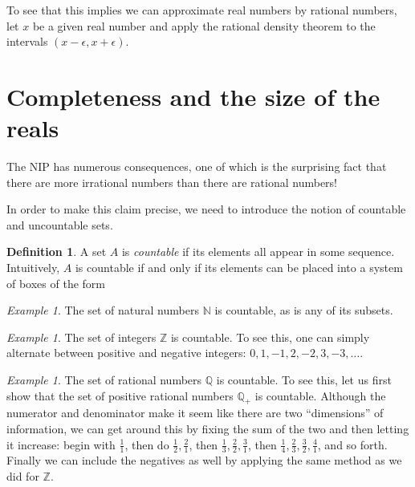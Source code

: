 \documentclass[11pt,oneside]{amsbook}
\newcommand{\NN}{\mathbb N}
\newcommand{\ZZ}{\mathbb Z}
\newcommand{\QQ}{\mathbb Q}
\theoremstyle{definition}
\theoremstyle{plain}
\theoremstyle{definition}
\newtheorem{defn}[thm]{Definition}
\theoremstyle{remark}
\newtheorem{example}[thm]{Example}
\numberwithin{equation}{section}
\numberwithin{figure}{section}
\begin{document}
To see that this implies we can approximate real numbers by rational numbers, let $x$ be a given real number and apply the rational density theorem to the intervals $(x-\epsilon,x+\epsilon)$.

\newpage
\section{Completeness and the size of the reals}

The NIP has numerous consequences, one of which is the surprising fact that there are more irrational numbers than there are rational numbers!

In order to make this claim precise, we need to introduce the notion of countable and uncountable sets.

\begin{defn}
  A set $A$ is \emph{countable} if its elements all appear in some sequence. Intuitively, $A$ is countable if and only if its elements can be placed into a system of boxes of the form
\begin{center}
\end{center}
\end{defn}

\begin{example}
  The set of natural numbers $\NN$ is countable, as is any of its subsets.
\end{example}

\begin{example}
  The set of integers $\ZZ$ is countable. To see this, one can simply alternate between positive and negative integers: $0,1,-1,2,-2,3,-3,\ldots$.
\end{example}

\begin{example}
  The set of rational numbers $\QQ$ is countable. To see this, let us first show that the set of positive rational numbers $\QQ_+$ is countable. Although the numerator and denominator make it seem like there are two ``dimensions'' of information, we can get around this by fixing the sum of the two and then letting it increase: begin with $\frac11$, then do $\frac12,\frac21$, then $\frac13,\frac22,\frac31$, then $\frac14,\frac23,\frac32,\frac41$, and so forth. Finally we can include the negatives as well by applying the same method as we did for $\ZZ$.
\end{example}
\end{document}

